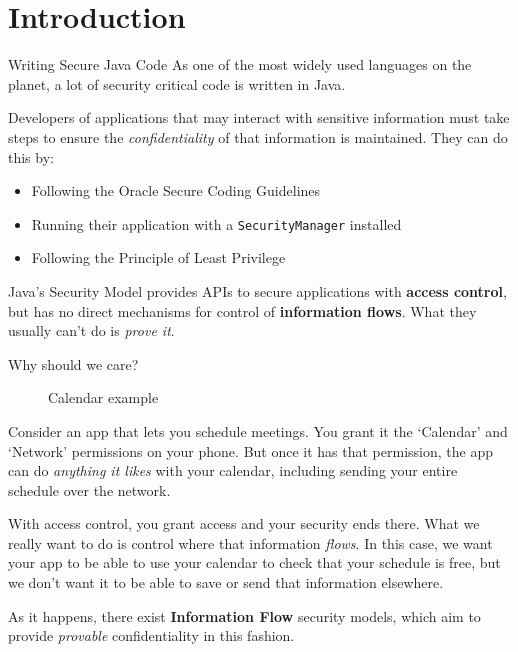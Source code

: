 \section{Introduction}

\begin{frame}{Writing Secure Java Code}
	As one of the most widely used languages on the planet, a lot of security critical code is written in Java.
	
	Developers of applications that may interact with sensitive information must take steps to ensure the \textit{confidentiality} of that information is maintained. They can do this by:
	
	\begin{itemize}
		\item Following the Oracle Secure Coding Guidelines
		\item Running their application with a \texttt{SecurityManager} installed
		\item Following the Principle of Least Privilege
	\end{itemize}
	
	Java's Security Model provides APIs to secure applications with \textbf{access control}, but has no direct mechanisms for control of \textbf{information flows}.
	What they usually can't do is \textit{prove it}.
\end{frame}

\begin{frame}{Why should we care?}

	\begin{figure}
		\caption{Calendar example}
	\end{figure}
	
	Consider an app that lets you schedule meetings. You grant it the `Calendar' and `Network' permissions on your phone. But once it has that permission, the app can do \textit{anything it likes} with your calendar, including sending your entire schedule over the network.
	
	With access control, you grant access and your security ends there. What we really want to do is control where that information \textit{flows}. In this case, we want your app to be able to use your calendar to check that your schedule is free, but we don't want it to be able to save or send that information elsewhere.
	
	As it happens, there exist \textbf{Information Flow} security models, which aim to provide \textit{provable} confidentiality in this fashion.
\end{frame}



